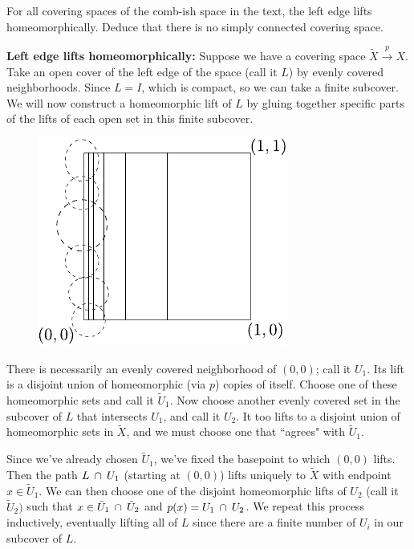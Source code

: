 \documentclass[twoside,10pt]{article}
\begin{document}

\begin{exer}[1.3: 5]
	For all covering spaces of the comb-ish space in the text, the left edge lifts homeomorphically. Deduce that there is no simply connected covering space.
\end{exer}

\textbf{Left edge lifts homeomorphically:} Suppose we have a covering space $\tilde{X}\stackrel{p}{\to } X$. Take an open cover of the left edge of the space (call it $L$) by evenly covered neighborhoods. Since $L=I$, which is compact, so we can take a finite subcover. We will now construct a homeomorphic lift of $L$ by gluing together specific parts of the lifts of each open set in this finite subcover.

\begin{figure}[H]
	\centering
	\includegraphics[scale=1]{fig/5a.pdf}
\end{figure}

There is necessarily an evenly covered neighborhood of $(0,0)$; call it $U_1$. Its lift is a disjoint union of homeomorphic (via $p$) copies of itself. Choose one of these homeomorphic sets and call it $\tilde{U}_1$. Now choose another evenly covered set in the subcover of $L$ that intersects $U_1$, and call it $U_2$. It too lifts to a disjoint union of homeomorphic sets in $\tilde{X}$, and we must choose one that ``agrees" with $\tilde{U}_1$.

Since we've already chosen $\tilde{U}_1$, we've fixed the basepoint to which $(0,0)$ lifts. Then the path $L \operatorname{\;\cap\;} U_1$ (starting at $(0,0)$) lifts uniquely to $\tilde{X}$ with endpoint $x \in \tilde{U}_1$. We can then choose one of the disjoint homeomorphic lifts of $U_2$ (call it $\tilde{U}_2)$ such that $x \in \tilde{U}_1 \operatorname{\;\cap\;} \tilde{U}_2$ and $p(x) = U_1 \operatorname{\;\cap\;} U_2$. We repeat this process inductively, eventually lifting all of $L$ since there are a finite number of $U_i$ in our subcover of $L$.
\end{document}
